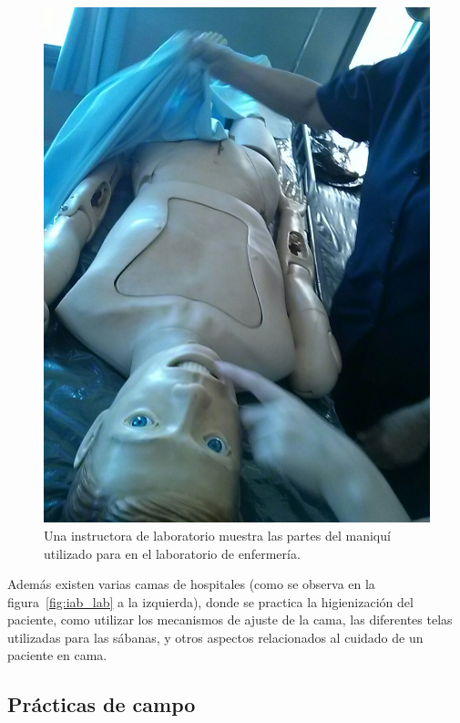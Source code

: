 \begin{figure}[h!t] 
\centering 
\includegraphics[scale=0.2,natwidth=400,natheight=200]{problema/iab_sala_3.jpg}
\caption{Una instructora de laboratorio muestra las partes del maniquí utilizado
    para en el laboratorio de enfermería.}
\label{fig:iab_mani}
\end{figure}

Además existen varias camas de hospitales (como se observa en la
figura~\ref{fig:iab_lab} a la izquierda), donde se practica la higienización del
paciente, como utilizar los mecanismos de ajuste de la cama, las diferentes
telas utilizadas para las sábanas, y otros aspectos relacionados al cuidado de
un paciente en cama.


\subsection{Prácticas de campo}
\label{sec:practica_hos}

